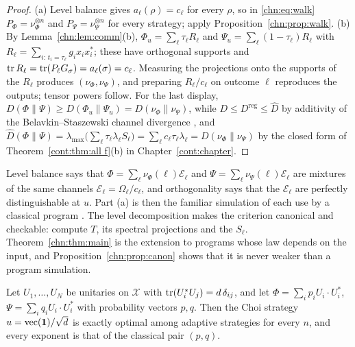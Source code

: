 \begin{proof}
(a) Level balance gives $a_\ell(\rho)=c_\ell$ for every $\rho$, so in \eqref{chn:eq:walk} $P_\Phi=\nu_\Phi^{\otimes n}$ and $P_\Psi=\nu_\Psi^{\otimes n}$ for every strategy; apply Proposition~\ref{chn:prop:walk}. (b) By Lemma~\ref{chn:lem:comm}(b), $\Phi_u=\sum_\ell\tau_\ell R_\ell$ and $\Psi_u=\sum_\ell(1-\tau_\ell)R_\ell$ with $R_\ell=\sum_{i:\,t_i=\tau_\ell}g_ix_ix_i^*$; these have orthogonal supports and $\operatorname{tr} R_\ell=\operatorname{tr}(P_\ell G_\sigma)=a_\ell(\sigma)=c_\ell$. Measuring the projections onto the supports of the $R_\ell$ produces $(\nu_\Phi,\nu_\Psi)$, and preparing $R_\ell/c_\ell$ on outcome $\ell$ reproduces the outputs; tensor powers follow. For the last display, $D(\Phi\|\Psi)\ge D(\Phi_u\|\Psi_u)=D(\nu_\Phi\|\nu_\Psi)$, while $D\le D^{\mathrm{reg}}\le\widehat D$ by additivity of the Belavkin--Staszewski channel divergence \cite{FangFawzi2021}, and $\widehat D(\Phi\|\Psi)=\lambda_{\max}\big(\sum_\ell\tau_\ell\lambda_\ell S_\ell\big)=\sum_\ell c_\ell\tau_\ell\lambda_\ell=D(\nu_\Phi\|\nu_\Psi)$ by the closed form of Theorem~\ref{cont:thm:all f}(b) in Chapter~\ref{cont:chapter}.
\end{proof}

\begin{remark}
Level balance says that $\Phi=\sum_\ell\nu_\Phi(\ell)\mathcal E_\ell$ and $\Psi=\sum_\ell\nu_\Psi(\ell)\mathcal E_\ell$ are mixtures of the same channels $\mathcal E_\ell=\Omega_\ell/c_\ell$, and orthogonality says that the $\mathcal E_\ell$ are perfectly distinguishable at $u$. Part (a) is then the familiar simulation of each use by a classical program \cite{Pirandola2019}. The level decomposition makes the criterion canonical and checkable: compute $T$, its spectral projections and the $S_\ell$. Theorem~\ref{chn:thm:main} is the extension to programs whose law depends on the input, and Proposition~\ref{chn:prop:canon} shows that it is never weaker than a program simulation.
\end{remark}

\begin{corollary}\label{chn:cor:ru}
Let $U_1,\dots,U_N$ be unitaries on $\mathcal X$ with $\operatorname{tr}(U_i^*U_j)=d\,\delta_{ij}$, and let $\Phi=\sum_ip_iU_i\cdot U_i^*$, $\Psi=\sum_iq_iU_i\cdot U_i^*$ with probability vectors $p,q$. Then the Choi strategy $u=\operatorname{vec}(\mathbf 1)/\sqrt d$ is exactly optimal among adaptive strategies for every $n$, and every exponent is that of the classical pair $(p,q)$.
\end{corollary}

